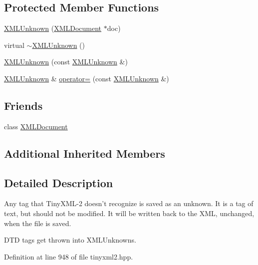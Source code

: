 \subsection*{Protected Member Functions}
\begin{DoxyCompactItemize}
\item 
\hyperlink{classtinyxml2_1_1_x_m_l_unknown_a9391eb679598d50baba424e6f1aa367b}{X\-M\-L\-Unknown} (\hyperlink{classtinyxml2_1_1_x_m_l_document}{X\-M\-L\-Document} $\ast$doc)
\item 
virtual \hyperlink{classtinyxml2_1_1_x_m_l_unknown_a86fcd722ca173a7f385bafafa879f26e}{$\sim$\-X\-M\-L\-Unknown} ()
\item 
\hyperlink{classtinyxml2_1_1_x_m_l_unknown_aab31a93c95a7cedc9597cea7caffa73f}{X\-M\-L\-Unknown} (const \hyperlink{classtinyxml2_1_1_x_m_l_unknown}{X\-M\-L\-Unknown} \&)
\item 
\hyperlink{classtinyxml2_1_1_x_m_l_unknown}{X\-M\-L\-Unknown} \& \hyperlink{classtinyxml2_1_1_x_m_l_unknown_a6137d5611db42c35de3d869f66555e5b}{operator=} (const \hyperlink{classtinyxml2_1_1_x_m_l_unknown}{X\-M\-L\-Unknown} \&)
\end{DoxyCompactItemize}
\subsection*{Friends}
\begin{DoxyCompactItemize}
\item 
class \hyperlink{classtinyxml2_1_1_x_m_l_unknown_a4eee3bda60c60a30e4e8cd4ea91c4c6e}{X\-M\-L\-Document}
\end{DoxyCompactItemize}
\subsection*{Additional Inherited Members}


\subsection{Detailed Description}
Any tag that Tiny\-X\-M\-L-\/2 doesn't recognize is saved as an unknown. It is a tag of text, but should not be modified. It will be written back to the X\-M\-L, unchanged, when the file is saved.

D\-T\-D tags get thrown into X\-M\-L\-Unknowns. 

Definition at line 948 of file tinyxml2.\-hpp.



